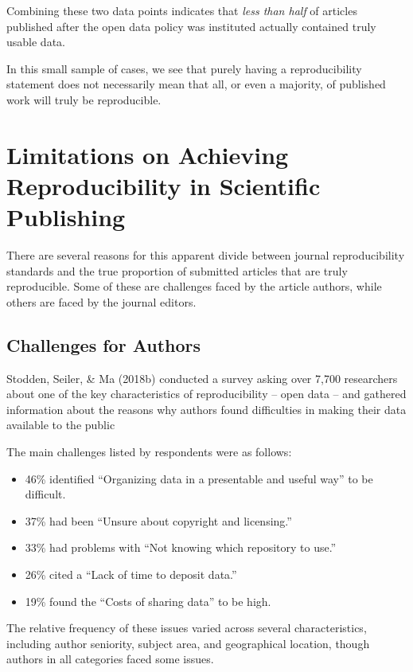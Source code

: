 \documentclass[12pt,twoside]{reedthesis}
\providecommand{\tightlist}{%
  \setlength{\itemsep}{0pt}\setlength{\parskip}{0pt}}
\begin{document}
Combining these two data points indicates that \emph{less than half} of
articles published after the open data policy was instituted actually
contained truly usable data.

In this small sample of cases, we see that purely having a
reproducibility statement does not necessarily mean that all, or even a
majority, of published work will truly be reproducible.

\section{Limitations on Achieving Reproducibility in Scientific
Publishing}\label{limitations-on-achieving-reproducibility-in-scientific-publishing}

There are several reasons for this apparent divide between journal
reproducibility standards and the true proportion of submitted articles
that are truly reproducible. Some of these are challenges faced by the
article authors, while others are faced by the journal editors.

\subsection{Challenges for Authors}\label{challenges-for-authors}

Stodden, Seiler, \& Ma (2018b) conducted a survey asking over 7,700
researchers about one of the key characteristics of reproducibility --
open data -- and gathered information about the reasons why authors
found difficulties in making their data available to the public

The main challenges listed by respondents were as follows:
\begin{itemize}
\tightlist
\item
  46\% identified ``Organizing data in a presentable and useful way'' to
  be difficult.
\item
  37\% had been ``Unsure about copyright and licensing.''
\item
  33\% had problems with ``Not knowing which repository to use.''
\item
  26\% cited a ``Lack of time to deposit data.''
\item
  19\% found the ``Costs of sharing data'' to be high.
\end{itemize}
The relative frequency of these issues varied across several
characteristics, including author seniority, subject area, and
geographical location, though authors in all categories faced some
issues.
\end{document}
